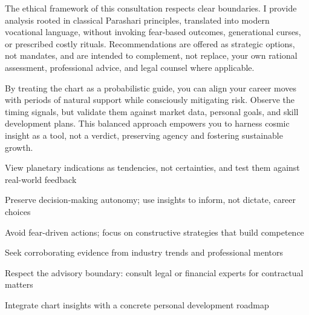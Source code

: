 {\fontsize{9}{13}\selectfont The ethical framework of this consultation respects clear boundaries. I provide analysis rooted in classical Parashari principles, translated into modern vocational language, without invoking fear-based outcomes, generational curses, or prescribed costly rituals. Recommendations are offered as strategic options, not mandates, and are intended to complement, not replace, your own rational assessment, professional advice, and legal counsel where applicable.}\par\vspace{1.8mm}

{\fontsize{9}{13}\selectfont By treating the chart as a probabilistic guide, you can align your career moves with periods of natural support while consciously mitigating risk. Observe the timing signals, but validate them against market data, personal goals, and skill development plans. This balanced approach empowers you to harness cosmic insight as a tool, not a verdict, preserving agency and fostering sustainable growth.}\par\vspace{1.8mm}

\begin{diamondlist}
  \item {\fontsize{8.5}{12}\selectfont View planetary indications as tendencies, not certainties, and test them against real-world feedback}
  \item {\fontsize{8.5}{12}\selectfont Preserve decision-making autonomy; use insights to inform, not dictate, career choices}
  \item {\fontsize{8.5}{12}\selectfont Avoid fear-driven actions; focus on constructive strategies that build competence}
  \item {\fontsize{8.5}{12}\selectfont Seek corroborating evidence from industry trends and professional mentors}
  \item {\fontsize{8.5}{12}\selectfont Respect the advisory boundary: consult legal or financial experts for contractual matters}
  \item {\fontsize{8.5}{12}\selectfont Integrate chart insights with a concrete personal development roadmap}
\end{diamondlist}


\label{topic3}

